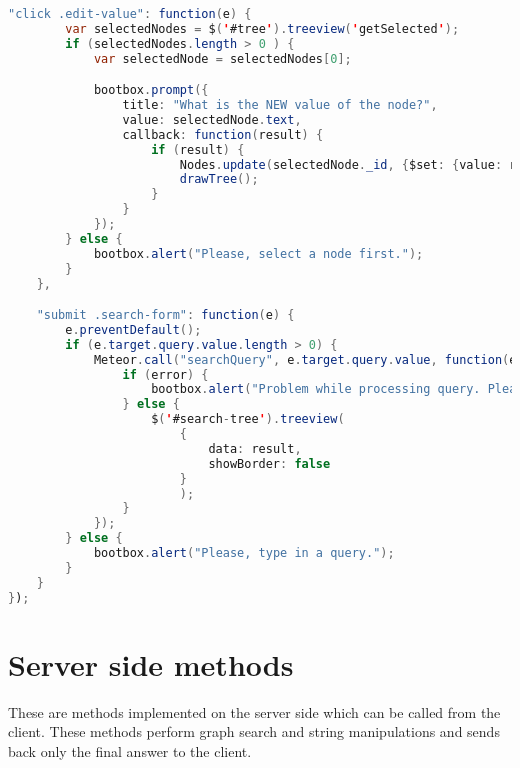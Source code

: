 \begin{lstlisting}[language=java]
    "click .edit-value": function(e) {
        var selectedNodes = $('#tree').treeview('getSelected');
        if (selectedNodes.length > 0 ) {
            var selectedNode = selectedNodes[0];

            bootbox.prompt({
                title: "What is the NEW value of the node?",
                value: selectedNode.text,
                callback: function(result) {
                    if (result) {
                        Nodes.update(selectedNode._id, {$set: {value: result}});
                        drawTree();
                    }
                }
            });
        } else {
            bootbox.alert("Please, select a node first.");
        }
    },

    "submit .search-form": function(e) {
        e.preventDefault();
        if (e.target.query.value.length > 0) {
            Meteor.call("searchQuery", e.target.query.value, function(error, result){
                if (error) {
                    bootbox.alert("Problem while processing query. Please, try again.");
                } else {
                    $('#search-tree').treeview(
                        {
                            data: result,
                            showBorder: false
                        }
                        );
                }
            });
        } else {
            bootbox.alert("Please, type in a query.");
        }
    }
});
\end{lstlisting}


\section*{Server side methods}

These are methods implemented on the server side which can be called from the client.
These methods perform graph search and string manipulations and sends back only the final answer to the client.

